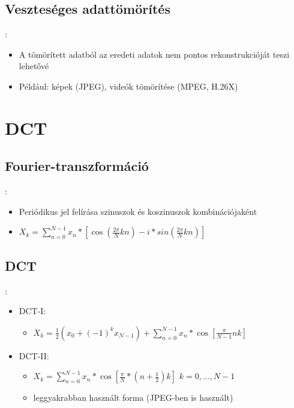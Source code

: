 \documentclass{beamer}
\begin{document}
\subsection{Veszteséges adattömörítés}
\begin{frame}{\secname : \subsecname}
\begin{itemize}
    \item A tömörített adatból az eredeti adatok nem pontos rekonstrukcióját teszi lehetővé
    \item Például: képek (JPEG), videók tömörítése (MPEG, H.26X)
\end{itemize}    
\end{frame}

\section{DCT}

\subsection{Fourier-transzformáció}
\begin{frame}{\secname : \subsecname}
    \begin{itemize}
        \item Periódikus jel felírása szinuszok és koszinuszok kombinációjaként
        \item $ X_k = \sum_{n=0}^{N - 1} x_n * [\cos(\frac{2 \pi}{N} kn) - i * sin(\frac{2\pi}{N} kn)]$
    \end{itemize}
\end{frame}

\subsection{DCT}
\begin{frame}{\secname : \subsecname}
    \begin{itemize}
        \item DCT-I:
        \begin{itemize}
            \item $ X_k = \frac{1}{2} (x_0 + (-1)^kx_{N-1}) + \sum_{n=0}^{N - 1} x_n * \cos[\frac{\pi}{N - 1} nk]$
        \end{itemize}
        \item DCT-II:
        \begin{itemize}
            \item $ X_k = \sum_{n=0}^{N - 1} x_n * \cos[\frac{\pi}{N} * (n + \frac{1}{2})k] $ $k=0,...,N-1$
            \item leggyakrabban használt forma (JPEG-ben is használt)
        \end{itemize}
    \end{itemize}
    
\end{frame}
\end{document}
